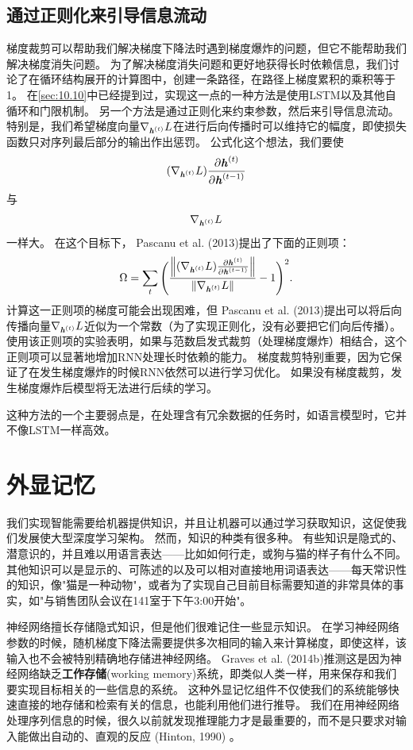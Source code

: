 \subsection{通过正则化来引导信息流动}
\label{sec:10.11.2}
梯度裁剪可以帮助我们解决梯度下降法时遇到梯度爆炸的问题，但它不能帮助我们解决梯度消失问题。
为了解决梯度消失问题和更好地获得长时依赖信息，我们讨论了在循环结构展开的计算图中，创建一条路径，在路径上梯度累积的乘积等于1。
在\ref{sec:10.10}中已经提到过，实现这一点的一种方法是使用LSTM以及其他自循环和门限机制。
另一个方法是通过正则化来约束参数，然后来引导信息流动。
特别是，我们希望梯度向量$\nabla_{\boldsymbol{\mathit{h}}^{(t)}} L$在进行后向传播时可以维持它的幅度，即使损失函数只对序列最后部分的输出作出惩罚。
公式化这个想法，我们要使
\begin{align}
 (\nabla_{\boldsymbol{\mathit{h}}^{(t)}} L) \frac{\partial \boldsymbol{\mathit{h}}^{(t)}}{\partial \boldsymbol{\mathit{h}}^{(t-1)}}
\end{align}
与
\begin{align}
\nabla_{\boldsymbol{\mathit{h}}^{(t)}} L 
\end{align}
一样大。
在这个目标下， Pascanu et al. (2013)提出了下面的正则项：
\begin{align}
 \Omega = \sum_t \Bigg(  \frac{
 \left\lVert (\nabla_{\boldsymbol{\mathit{h}}^{(t)}} L) \frac{\partial \boldsymbol{\mathit{h}}^{(t)}}{\partial \boldsymbol{\mathit{h}}^{(t-1)}}\right\rVert}
 {\left\lVert\nabla_{\boldsymbol{\mathit{h}}^{(t)}} L\right\rVert} -1 \Bigg)^2.
\end{align}
计算这一正则项的梯度可能会出现困难，但 Pascanu et al. (2013)提出可以将后向传播向量$\nabla_{\boldsymbol{\mathit{h}}^{(t)}} L$近似为一个常数（为了实现正则化，没有必要把它们向后传播）。
使用该正则项的实验表明，如果与范数启发式裁剪（处理梯度爆炸）相结合，这个正则项可以显著地增加RNN处理长时依赖的能力。
梯度裁剪特别重要，因为它保证了在发生梯度爆炸的时候RNN依然可以进行学习优化。
如果没有梯度裁剪，发生梯度爆炸后模型将无法进行后续的学习。

这种方法的一个主要弱点是，在处理含有冗余数据的任务时，如语言模型时，它并不像LSTM一样高效。


\section{外显记忆}
\label{sec:10.12}
我们实现智能需要给机器提供知识，并且让机器可以通过学习获取知识，这促使我们发展使大型深度学习架构。
然而，知识的种类有很多种。
有些知识是隐式的、潜意识的，并且难以用语言表达——比如如何行走，或狗与猫的样子有什么不同。
其他知识可以是显示的、可陈述的以及可以相对直接地用词语表达——每天常识性的知识，像"猫是一种动物"，或者为了实现自己目前目标需要知道的非常具体的事实，如"与销售团队会议在141室于下午3:00开始"。


神经网络擅长存储隐式知识，但是他们很难记住一些显示知识。
在学习神经网络参数的时候，随机梯度下降法需要提供多次相同的输入来计算梯度，即使这样，该输入也不会被特别精确地存储进神经网络。
 Graves et al. (2014b)推测这是因为神经网络缺乏\textbf{工作存储}(working memory)系统，即类似人类一样，用来保存和我们要实现目标相关的一些信息的系统。
这种外显记忆组件不仅使我们的系统能够快速直接的地存储和检索有关的信息，也能利用他们进行推导。
我们在用神经网络处理序列信息的时候，很久以前就发现推理能力才是最重要的，而不是只要求对输入能做出自动的、直观的反应 (Hinton, 1990) 。



